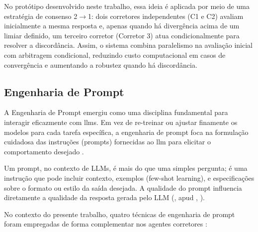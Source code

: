 No protótipo desenvolvido neste trabalho, essa ideia é aplicada por meio de uma estratégia de consenso 2$\rightarrow$1: dois corretores independentes (C1 e C2) avaliam inicialmente a mesma resposta e, apenas quando há divergência acima de um limiar definido, um terceiro corretor (Corretor 3) atua condicionalmente para resolver a discordância. Assim, o sistema combina paralelismo na avaliação inicial com arbitragem condicional, reduzindo custo computacional em casos de convergência e aumentando a robustez quando há discordância.

\subsection{Engenharia de Prompt}

A Engenharia de Prompt emergiu como uma disciplina fundamental para interagir eficazmente com \gls{llm}s. Em vez de re-treinar ou ajustar finamente os modelos para cada tarefa específica, a engenharia de prompt foca na formulação cuidadosa das instruções (prompts) fornecidas ao \gls{llm} para elicitar o comportamento desejado \cite{sahoo_systematic_2025}.

Um prompt, no contexto de LLMs, é mais do que uma simples pergunta; é uma instrução que pode incluir contexto, exemplos (few-shot learning), e especificações sobre o formato ou estilo da saída desejada. A qualidade do prompt influencia diretamente a qualidade da resposta gerada pelo LLM (\citeauthor{liu_prompt_2023}, \citeyear{liu_prompt_2023} apud \citeauthor{sahoo_systematic_2025}, \citeyear{sahoo_systematic_2025}).

No contexto do presente trabalho, quatro técnicas de engenharia de prompt foram empregadas de forma complementar nos agentes corretores \cite{sahoo_systematic_2025}:

